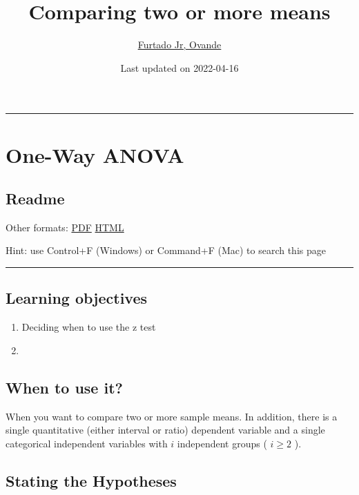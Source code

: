 \documentclass[
]{article}
\title{Comparing two or more means}
\author{\href{http://drfurtado.us}{Furtado Jr, Ovande}}
\date{Last updated on 2022-04-16}
\providecommand{\tightlist}{%
  \setlength{\itemsep}{0pt}\setlength{\parskip}{0pt}}
\begin{document}
\maketitle

{
\setcounter{tocdepth}{2}
\tableofcontents
}
\begin{center}\rule{0.5\linewidth}{0.5pt}\end{center}

\hypertarget{one-way-anova}{%
\section{One-Way ANOVA}\label{one-way-anova}}

\hypertarget{readme}{%
\subsection{Readme}\label{readme}}

Other formats: \href{z-test.pdf}{PDF} \textbar{} \href{z-test.html}{HTML}

Hint: use Control+F (Windows) or Command+F (Mac) to search this page

\begin{center}\rule{0.5\linewidth}{0.5pt}\end{center}

\hypertarget{learning-objectives}{%
\subsection{Learning objectives}\label{learning-objectives}}

\begin{enumerate}
\def\labelenumi{\arabic{enumi}.}
\tightlist
\item
  Deciding when to use the z test
\item
\end{enumerate}

\hypertarget{when-to-use-it}{%
\subsection{When to use it?}\label{when-to-use-it}}

When you want to compare two or more sample means. In addition, there is a single quantitative (either interval or ratio) dependent variable and a single categorical independent variables with \(i\) independent groups ( \(i\geq 2\) ).

\hypertarget{stating-the-hypotheses}{%
\subsection{Stating the Hypotheses}\label{stating-the-hypotheses}}
\end{document}
